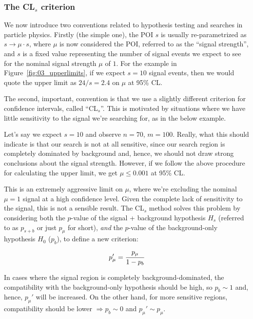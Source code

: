 \subsubsection{The \texorpdfstring{CL$_s$}{CLs} criterion}
\label{sec:03_cls}

We now introduce two conventions related to hypothesis testing and searches in particle physics. 
Firstly (the simple one), the POI $s$ is usually re-parametrized as $s \rightarrow \mu \cdot s$,
where $\mu$ is now considered the POI, referred to as the ``signal strength'', and $s$ is a fixed value representing the number of signal events we expect to see for the nominal signal strength $\mu$ of $1$. 
For the example in Figure~\ref{fig:03_upperlimits}, if we expect $s = 10$ signal events, then we would quote the upper limit as $24 / s = 2.4$ on $\mu$ at 95\% CL.

The second, important, convention is that we use a slightly different criterion for confidence intervals, called ``CL$_s$''. 
This is motivated by situations where we have little sensitivity to the signal we're searching for, as in the below example.

\begin{example}
\label{ex:03_cls}
Let's say we expect $s = 10$ and observe $n = 70$, $m = 100$. 
Really, what this should indicate is that our search is not at all sensitive, since our search region is completely dominated by background and, hence, we should not draw strong conclusions about the signal strength. 
However, if we follow the above procedure for calculating the upper limit, we get $\mu \leq 0.001$ at 95\% CL.
\end{example}

This is an extremely aggressive limit on $\mu$, where we're excluding the nominal $\mu = 1$ signal at a high confidence level.
Given the complete lack of sensitivity to the signal, this is not a sensible result.
The CL$_s$ method solves this problem by considering both the $p$-value of the signal + background hypothesis $H_s$ (referred to as $p_{s+b}$ or just $p_\mu$ for short), \textit{and} the $p$-value of the background-only hypothesis $H_0$ ($p_b$), to define a new criterion:
\begin{equation}
p_\mu' = \cfrac{p_\mu}{1 - p_b}
\label{eq:03_pmu_prime}
\end{equation}

In cases where the signal region is completely background-dominated, the compatibility with the background-only hypothesis should be high, so $p_b \sim 1$ and, hence, $p_\mu'$ will be increased. 
On the other hand, for more sensitive regions, compatibility should be lower $\Rightarrow p_b \sim 0$ and $p_\mu' \sim p_\mu$.

